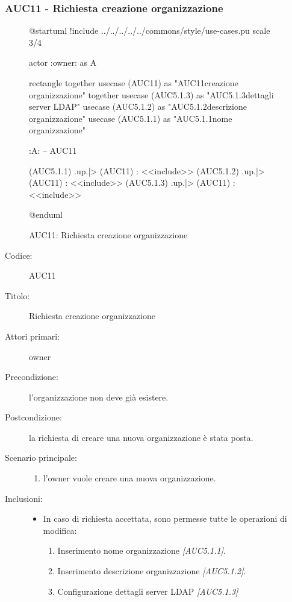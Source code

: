 \documentclass[../analisi-dei-requisiti.tex]{subfiles}
\begin{document}
\subsubsection{AUC11 - Richiesta creazione organizzazione}%
\label{subsub:AUC11}

\begin{figure}[h!]
  \centering
  \begin{plantuml}
  @startuml
  !include ../../../../../commons/style/use-cases.pu
  scale 3/4

  actor :owner: as A

  rectangle {
    together {
      usecase (AUC11) as "AUC11\nRichiesta creazione organizzazione"
    }
    together {
      usecase (AUC5.1.3) as "AUC5.1.3\nConfigurazione dettagli server LDAP"
      usecase (AUC5.1.2) as "AUC5.1.2\nInserisci descrizione organizzazione"
      usecase (AUC5.1.1) as "AUC5.1.1\nInserisci nome organizzazione"
    }
  }

  :A: -- AUC11

  (AUC5.1.1) .up.|> (AUC11) : <<include>>
  (AUC5.1.2) .up.|> (AUC11) : <<include>>
  (AUC5.1.3) .up.|> (AUC11) : <<include>>

  @enduml
  \end{plantuml}
  \caption{AUC11: Richiesta creazione organizzazione}
  \label{fig:auc11}
\end{figure}

\begin{description}
  \item[Codice:] AUC11
  \item[Titolo:] Richiesta creazione organizzazione
  \item[Attori primari:] owner
  \item[Precondizione:] l'organizzazione non deve già esistere.
  \item[Postcondizione:] la richiesta di creare una nuova organizzazione è stata posta.
  \item[Scenario principale:]
  \begin{enumerate}
    \item l'owner vuole creare una nuova organizzazione.
  \end{enumerate}
  \item[Inclusioni:]
  \begin{itemize}
    \item In caso di richiesta accettata, sono permesse tutte le operazioni di modifica:
    \begin{enumerate}
      \item Inserimento nome organizzazione \emph{[AUC5.1.1]}.
      \item Inserimento descrizione organizzazione \emph{[AUC5.1.2]}.
      \item Configurazione dettagli server LDAP \emph{[AUC5.1.3]}
    \end{enumerate}
  \end{itemize}
\end{description}
\end{document}
